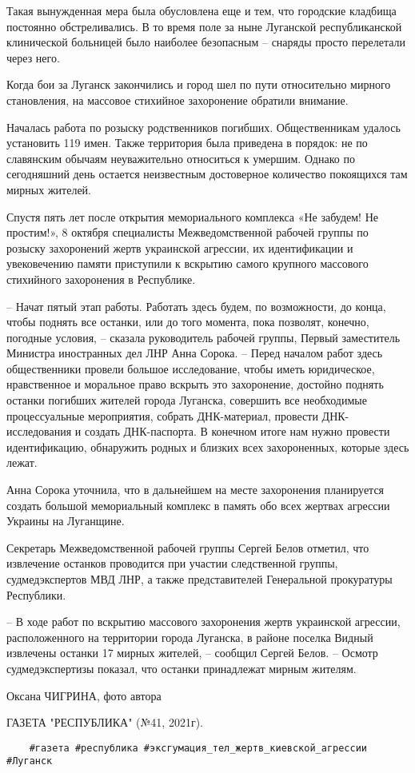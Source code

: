Такая вынужденная мера была обусловлена еще и тем, что городские кладбища
постоянно обстреливались. В то время поле за ныне Луганской республиканской
клинической больницей было наиболее безопасным – снаряды просто перелетали
через него.

Когда бои за Луганск закончились и город шел по пути относительно мирного
становления, на массовое стихийное захоронение обратили внимание.

Началась работа по розыску родственников погибших. Общественникам удалось
установить 119 имен. Также территория была приведена в порядок: не по
славянским обычаям неуважительно относиться к умершим. Однако по сегодняшний
день остается неизвестным достоверное количество покоящихся там мирных
жителей. 

Спустя пять лет после открытия мемориального комплекса «Не забудем! Не
простим!», 8 октября специалисты Межведомственной рабочей группы по розыску
захоронений жертв украинской агрессии, их идентификации и увековечению памяти
приступили к вскрытию самого крупного массового стихийного захоронения в
Республике.

– Начат пятый этап работы. Работать здесь будем, по возможности, до конца,
чтобы поднять все останки, или до того момента, пока позволят, конечно,
погодные условия, – сказала руководитель рабочей группы, Первый заместитель
Министра иностранных дел ЛНР Анна Сорока. – Перед началом работ здесь
общественники провели большое исследование, чтобы иметь юридическое,
нравственное и моральное право вскрыть это захоронение, достойно поднять
останки погибших жителей города Луганска, совершить все необходимые
процессуальные мероприятия, собрать ДНК-материал, провести ДНК-исследования и
создать ДНК-паспорта. В конечном итоге нам нужно провести идентификацию,
обнаружить родных и близких всех захороненных, которые здесь лежат. 

Анна Сорока уточнила, что в дальнейшем на месте захоронения планируется создать
большой мемориальный комплекс в память обо всех жертвах агрессии Украины на
Луганщине.

Секретарь Межведомственной рабочей группы Сергей Белов отметил, что извлечение
останков проводится при участии следственной группы, судмедэкспертов МВД ЛНР, а
также представителей Генеральной прокуратуры Республики.

– В ходе работ по вскрытию массового захоронения жертв украинской агрессии,
расположенного на территории города Луганска, в районе поселка Видный извлечены
останки 17 мирных жителей, – сообщил Сергей Белов. – Осмотр судмедэкспертизы
показал, что останки принадлежат мирным жителям.

Оксана ЧИГРИНА, фото автора

ГАЗЕТА "РЕСПУБЛИКА" (№41, 2021г).

\begin{verbatim}
	#газета #республика #эксгумация_тел_жертв_киевской_агрессии #Луганск
\end{verbatim}
